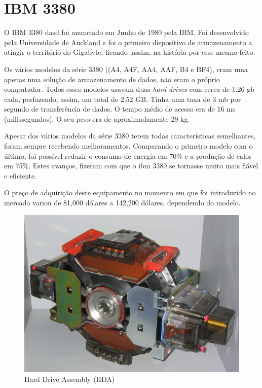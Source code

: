 \documentclass{report}
\begin{document}
\newpage		
		
		\section{IBM 3380}	
	O IBM 3380 \ac{dasd} foi anunciado em Junho de 1980 pela IBM. Foi desenvolvido pela Universidade de Auckland e foi o primeiro dispositivo de armazenamento a atingir o território do Gigabyte, ficando ,assim, na história por esse mesmo feito.
	\vspace{1mm}
	
	Os vários modelos da série 3380 ((A4, A4F, AA4, AAF, B4 e BF4), eram uma apenas uma solução de armazenamento de dados, não eram o próprio computador. Todos esses modelos usavam duas \textit{hard drives} com cerca de 1.26 \ac{gb} cada, perfazendo, assim, um total de 2.52 GB. Tinha uma taxa de 3 \ac{mb} por segundo de transferência de dados. O tempo médio de acesso era de 16 ms (milissegundos). O seu peso era de aproximadamente 29 kg. 
\vspace{1mm}

	
	Apesar dos vários modelos da série 3380 terem todas características semelhantes, foram sempre recebendo melhoramentos. Comparando o primeiro modelo com o último, foi possível reduzir o consumo de energia em 70\% e a produção de calor em 75\%. Estes avanços, fizeram com que o \ac{ibm} 3380 se tornasse muito mais fiável e eficiente.
\vspace{1mm}

	O preço de adquirição deste equipamento no momento em que foi introduzido no mercado variou de 81,000 dólares a 142,200 dólares, dependendo do modelo.
\vspace{1mm}

	\begin{figure} [h]
		\centering
		\includegraphics[scale=0.07]{ibm3380.jpg}
		\caption{Hard Drive Assembly (HDA)}
	\end{figure}
\end{document}

